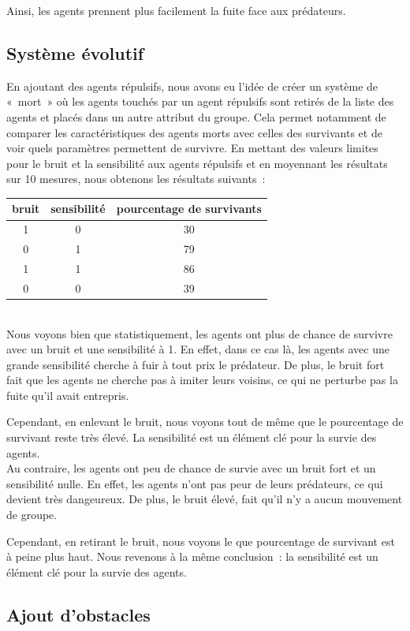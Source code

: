 \documentclass[french, a4paper, 12pt, openany]{report}
\begin{document}
   Ainsi, les agents prennent plus facilement la fuite face aux prédateurs.      
   

	\subsection{Système évolutif}
	
		En ajoutant des agents répulsifs, nous avons eu l'idée de créer un système de «~mort~» où les agents touchés par un agent répulsifs sont retirés de la liste des agents et placés dans un autre attribut du groupe. Cela permet notamment de comparer les caractéristiques des agents morts avec celles des survivants et de voir quels paramètres permettent de survivre. En mettant des valeurs limites pour le bruit et la sensibilité aux agents répulsifs et en moyennant les résultats sur 10 mesures, nous obtenons les résultats suivants~:\\
		
		\begin{tabular}{|c|c|c|} \hline
		\centering
			bruit & sensibilité & pourcentage de survivants \\ \hline
			1 & 0 & 30 \\ \hline
			0 & 1 & 79 \\ \hline
			1 & 1 & 86 \\ \hline
			0 & 0 & 39 \\ \hline
		\end{tabular}\\

   Nous voyons bien que statistiquement, les agents ont plus de chance de survivre avec un bruit et une sensibilité à 1. En effet, dans ce cas là, les agents avec une grande sensibilité cherche à fuir à tout prix le prédateur. De plus, le bruit fort fait que les agents ne cherche pas à imiter leurs voisins, ce qui ne perturbe pas la fuite qu'il avait entrepris. 
   
   Cependant, en enlevant le bruit, nous voyons tout de même que le pourcentage de survivant reste très élevé. La sensibilité est un élément clé pour la survie des agents.\\

  Au contraire, les agents ont peu de chance de survie avec un bruit fort et un sensibilité nulle. En effet, les agents n'ont pas peur de leurs prédateurs, ce qui devient très dangeureux. De plus, le bruit élevé, fait qu'il n'y a aucun mouvement de groupe.
  
  Cependant, en retirant le bruit, nous voyons le que pourcentage de survivant est à peine plus haut. Nous revenons à la même conclusion~: la sensibilité est un élément clé pour la survie des agents.
  

\subsection{Ajout d'obstacles}
	
\end{document}
